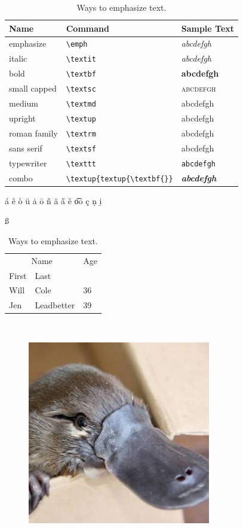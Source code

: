 \documentclass[a4paper,12pt,]{report}
\begin{document}
\begin{table}
\begin{tabular}{l|l|l}
\textbf{Name} & \textbf{Command} & \textbf{Sample Text} \\
\hline
emphasize & \verb|\emph| & \emph{abcdefgh} \\
italic & \verb|\textit| & \textit{abcdefgh} \\
bold & \verb|\textbf| & \textbf{abcdefgh} \\
small capped & \verb|\textsc| & \textsc{abcdefgh} \\
medium & \verb|\textmd| & \textmd{abcdefgh} \\
upright & \verb|\textup| & \textup{abcdefgh} \\
roman family & \verb|\textrm| & \textrm{abcdefgh} \\
sans serif & \verb|\textsf| & \textsf{abcdefgh} \\
typewriter & \verb|\texttt| & \texttt{abcdefgh} \\
combo & \verb|\textup{textup{\textbf{}}| & \textit{\textbf{abcdefgh}} \\
\end{tabular}
\caption{Ways to emphasize text.}\label{sec:typeemp}

\'{a} \^{e} \`{o} \"{u} \.{a} \={o} \~{n} \u{a} \H{a} \v{e} \t{oo} \c{c} \d{n} \b{i}

ß

\begin{tabular}{@{}*3l@{}}
\multicolumn{2}{c}{Name} &
\multicolumn{1}{c}{Age}\\
First & Last & \\
\hline
Will & Cole & 36\\
Jen & Leadbetter & 39\\
\end{tabular}\\

\end{table}
\begin{figure}[ht]
\centering

\includegraphics[width=8cm]{Platypus.jpg}
\end{figure}
\blindtext[2]
\end{document}

